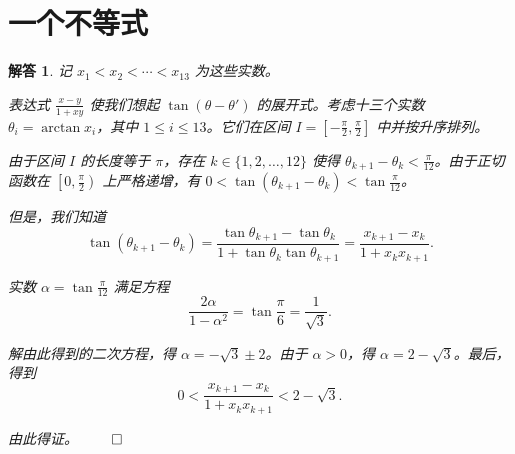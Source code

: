 \documentclass[12pt,UTF8,fontset=none]{ctexbook}
\theoremstyle{exercisestyle}
\theoremstyle{solutionstyle}
\newtheorem*{solution*}{解答}
\newenvironment{solution}
  {\begin{solution*}}
  {\hfill\ensuremath{\qed}\end{solution*}}
\begin{document}
\section{一个不等式}
\begin{solution}
  记 \(x_1 < x_2 < \cdots < x_{13}\) 为这些实数。

  表达式 \(\frac{x-y}{1+xy}\) 使我们想起 \(\tan(\theta - \theta')\) 的展开式。考虑十三个实数 \(\theta_i = \arctan x_i\)，其中 \(1 \leq i \leq 13\)。它们在区间 \(I = \left[-\frac{\pi}{2}, \frac{\pi}{2}\right]\) 中并按升序排列。

  由于区间 \(I\) 的长度等于 \(\pi\)，存在 \(k \in \{1, 2, \dots, 12\}\) 使得 \(\theta_{k+1} - \theta_k < \frac{\pi}{12}\)。由于正切函数在 \(\left[0, \frac{\pi}{2}\right)\) 上严格递增，有 \(0 < \tan(\theta_{k+1} - \theta_k) < \tan \frac{\pi}{12}\)。

  但是，我们知道
  \[
  \tan(\theta_{k+1} - \theta_k) = \frac{\tan \theta_{k+1} - \tan \theta_k}{1 + \tan \theta_k \tan \theta_{k+1}} = \frac{x_{k+1} - x_k}{1 + x_k x_{k+1}}.
  \]

  实数 \(\alpha = \tan \frac{\pi}{12}\) 满足方程
  \[
  \frac{2\alpha}{1-\alpha^2} = \tan\frac{\pi}{6} = \frac{1}{\sqrt{3}}.
  \]

  解由此得到的二次方程，得 \(\alpha = -\sqrt{3} \pm 2\)。由于 \(\alpha > 0\)，得 \(\alpha = 2 - \sqrt{3}\)。最后，得到
  \[
  0 < \frac{x_{k+1} - x_k}{1 + x_k x_{k+1}} < 2 - \sqrt{3}.
  \]

  由此得证。
\end{solution}
\end{document}
